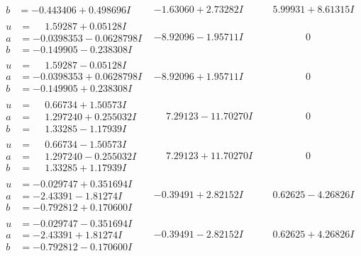 \documentclass[1p]{elsarticle_modified}
\theoremstyle{definition}
\begin{document}
$$\begin{array}{c|c|c}
\begin{aligned}
b &= -0.443406 + 0.498696 I\end{aligned}
 & -1.63060 + 2.73282 I & \phantom{-}5.99931 + 8.61315 I \\ \hline\begin{aligned}
u &= \phantom{-}1.59287 + 0.05128 I \\
a &= -0.0398353 - 0.0628798 I \\
b &= -0.149905 - 0.238308 I\end{aligned}
 & -8.92096 - 1.95711 I & \phantom{-0.000000 } 0 \\ \hline\begin{aligned}
u &= \phantom{-}1.59287 - 0.05128 I \\
a &= -0.0398353 + 0.0628798 I \\
b &= -0.149905 + 0.238308 I\end{aligned}
 & -8.92096 + 1.95711 I & \phantom{-0.000000 } 0 \\ \hline\begin{aligned}
u &= \phantom{-}0.66734 + 1.50573 I \\
a &= \phantom{-}1.297240 + 0.255032 I \\
b &= \phantom{-}1.33285 - 1.17939 I\end{aligned}
 & \phantom{-}7.29123 - 11.70270 I & \phantom{-0.000000 } 0 \\ \hline\begin{aligned}
u &= \phantom{-}0.66734 - 1.50573 I \\
a &= \phantom{-}1.297240 - 0.255032 I \\
b &= \phantom{-}1.33285 + 1.17939 I\end{aligned}
 & \phantom{-}7.29123 + 11.70270 I & \phantom{-0.000000 } 0 \\ \hline\begin{aligned}
u &= -0.029747 + 0.351694 I \\
a &= -2.43391 - 1.81274 I \\
b &= -0.792812 + 0.170600 I\end{aligned}
 & -0.39491 + 2.82152 I & \phantom{-}0.62625 - 4.26826 I \\ \hline\begin{aligned}
u &= -0.029747 - 0.351694 I \\
a &= -2.43391 + 1.81274 I \\
b &= -0.792812 - 0.170600 I\end{aligned}
 & -0.39491 - 2.82152 I & \phantom{-}0.62625 + 4.26826 I \\ \hline\begin{aligned}

\end{aligned}
\end{array}$$
\end{document}
